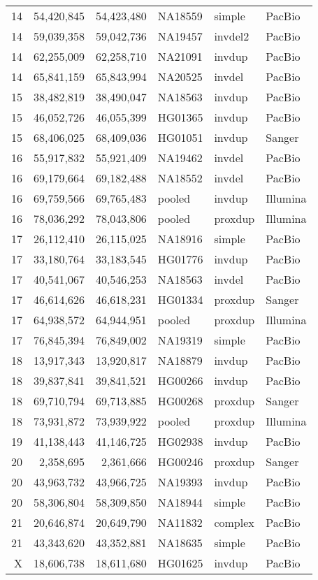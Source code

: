 {\begin{longtable}{rrrlll}
    14  & 54,420,845  & 54,423,480  & NA18559 & simple  & PacBio  \\
    14  & 59,039,358  & 59,042,736  & NA19457 & invdel2 & PacBio  \\
    14  & 62,255,009  & 62,258,710  & NA21091 & invdup  & PacBio  \\
    14  & 65,841,159  & 65,843,994  & NA20525 & invdel  & PacBio  \\
    15  & 38,482,819  & 38,490,047  & NA18563 & invdup  & PacBio  \\
    15  & 46,052,726  & 46,055,399  & HG01365 & invdup  & PacBio  \\
    15  & 68,406,025  & 68,409,036  & HG01051 & invdup  & Sanger  \\
    16  & 55,917,832  & 55,921,409  & NA19462 & invdel  & PacBio  \\
    16  & 69,179,664  & 69,182,488  & NA18552 & invdel  & PacBio  \\
    16  & 69,759,566  & 69,765,483  & pooled  & invdup  & Illumina  \\
    16  & 78,036,292  & 78,043,806  & pooled  & proxdup & Illumina  \\
    17  & 26,112,410  & 26,115,025  & NA18916 & simple  & PacBio  \\
    17  & 33,180,764  & 33,183,545  & HG01776 & invdup  & PacBio  \\
    17  & 40,541,067  & 40,546,253  & NA18563 & invdel  & PacBio  \\
    17  & 46,614,626  & 46,618,231  & HG01334 & proxdup & Sanger  \\
    17  & 64,938,572  & 64,944,951  & pooled  & proxdup & Illumina  \\
    17  & 76,845,394  & 76,849,002  & NA19319 & simple  & PacBio  \\
    18  & 13,917,343  & 13,920,817  & NA18879 & invdup  & PacBio  \\
    18  & 39,837,841  & 39,841,521  & HG00266 & invdup  & PacBio  \\
    18  & 69,710,794  & 69,713,885  & HG00268 & proxdup & Sanger  \\
    18  & 73,931,872  & 73,939,922  & pooled  & proxdup & Illumina  \\
    19  & 41,138,443  & 41,146,725  & HG02938 & invdup  & PacBio  \\
    20  & 2,358,695   & 2,361,666   & HG00246 & proxdup & Sanger  \\
    20  & 43,963,732  & 43,966,725  & NA19393 & invdup  & PacBio  \\
    20  & 58,306,804  & 58,309,850  & NA18944 & simple  & PacBio  \\
    21  & 20,646,874  & 20,649,790  & NA11832 & complex & PacBio  \\
    21  & 43,343,620  & 43,352,881  & NA18635 & simple  & PacBio  \\
    X   & 18,606,738  & 18,611,680  & HG01625 & invdup  & PacBio  \\
    \end{longtable}
}
